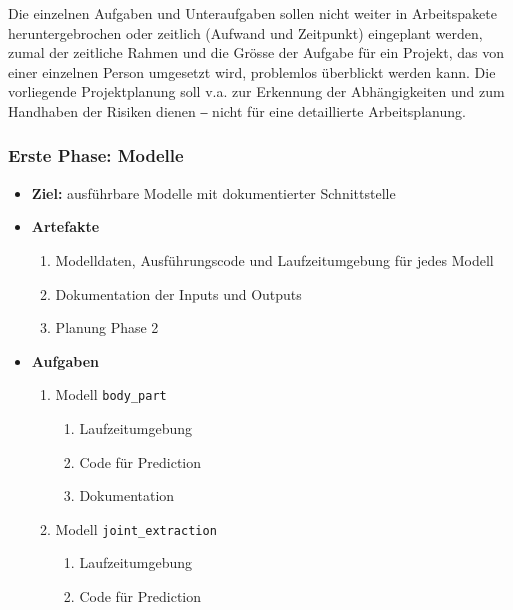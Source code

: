 Die einzelnen Aufgaben und Unteraufgaben sollen nicht weiter in Arbeitspakete heruntergebrochen oder zeitlich (Aufwand und Zeitpunkt) eingeplant werden, zumal der zeitliche Rahmen und die Grösse der Aufgabe für ein Projekt, das von einer einzelnen Person umgesetzt wird, problemlos überblickt werden kann. Die vorliegende Projektplanung soll v.a. zur Erkennung der Abhängigkeiten und zum Handhaben der Risiken dienen ‒ nicht für eine detaillierte Arbeitsplanung.

\subsubsection{Erste Phase: Modelle}

\begin{itemize}
    \item \textbf{Ziel:} ausführbare Modelle mit dokumentierter Schnittstelle
    \item \textbf{Artefakte}
        \begin{enumerate}
            \item Modelldaten, Ausführungscode und Laufzeitumgebung für jedes Modell
            \item Dokumentation der Inputs und Outputs
            \item Planung Phase 2
        \end{enumerate}
    \item \textbf{Aufgaben}
        \begin{enumerate}
            \item Modell \texttt{body\_part}
                \begin{multicols}{2}
                    \begin{enumerate}
                        \item Laufzeitumgebung
                        \item Code für Prediction
                        \item Dokumentation
                    \end{enumerate}
                \end{multicols}
            \item Modell \texttt{joint\_extraction}
                \begin{multicols}{2}
                    \begin{enumerate}
                        \item Laufzeitumgebung
                        \item Code für Prediction

\end{enumerate}
\end{multicols}
\end{enumerate}
\end{itemize}
